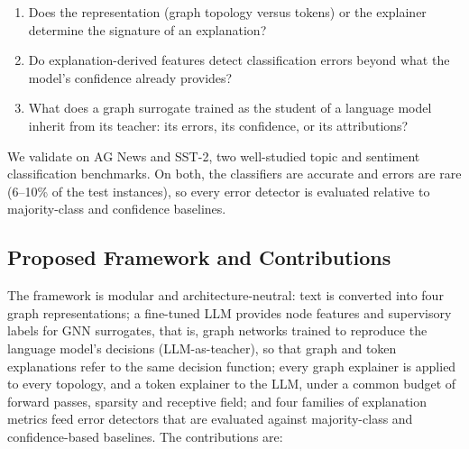 \begin{enumerate}
    \item Does the representation (graph topology versus tokens) or the explainer determine the signature of an explanation?
    \item Do explanation-derived features detect classification errors beyond what the model's confidence already provides?
    \item What does a graph surrogate trained as the student of a language model inherit from its teacher: its errors, its confidence, or its attributions?
\end{enumerate}

We validate on AG News and SST-2, two well-studied topic and sentiment classification benchmarks. On both, the classifiers are accurate and errors are rare (6--10\% of the test instances), so every error detector is evaluated relative to majority-class and confidence baselines.

\subsection{Proposed Framework and Contributions}

The framework is modular and architecture-neutral: text is converted into four graph representations; a fine-tuned LLM provides node features and supervisory labels for GNN surrogates, that is, graph networks trained to reproduce the language model's decisions (LLM-as-teacher), so that graph and token explanations refer to the same decision function; every graph explainer is applied to every topology, and a token explainer to the LLM, under a common budget of forward passes, sparsity and receptive field; and four families of explanation metrics feed error detectors that are evaluated against majority-class and confidence-based baselines. The contributions are:

